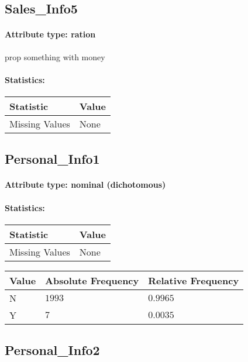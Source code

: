 \subsection{Sales\_Info5}
\paragraph{Attribute type: ration} prop something with money
\paragraph{Statistics: }
\begin{table}[H]
	\renewcommand{\arraystretch}{1.25}
	\begin{tabular}{l|l}
		\textbf{Statistic} & \textbf{Value}\\\hline
		Missing Values& None\\\hline
	\end{tabular}
\end{table}

\subsection{Personal\_Info1}
\paragraph{Attribute type: nominal (dichotomous)}
\paragraph{Statistics: }
\begin{table}[H]
	\renewcommand{\arraystretch}{1.25}
	\begin{tabular}{l|l}
		\textbf{Statistic} & \textbf{Value}\\\hline
		Missing Values& None\\\hline
	\end{tabular}
\end{table}
\begin{table}[H]
	\renewcommand{\arraystretch}{1.25}
	\begin{tabular}{l|l|l}
		\textbf{Value} & \textbf{Absolute Frequency} & \textbf{Relative Frequency}\\\hline
		N&$1993$&$0.9965$\\\hline
		Y&$7$&$0.0035$
	\end{tabular}
\end{table}

\subsection{Personal\_Info2}
